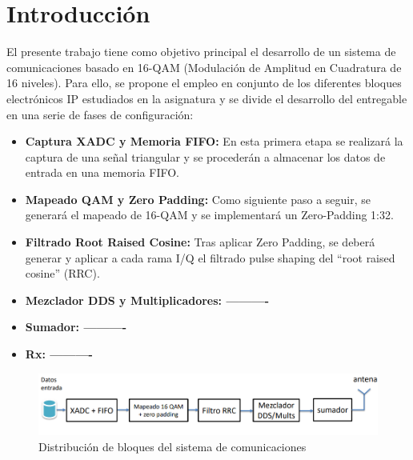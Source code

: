 \chapter{Introducción}
\label{section:intro}

El presente trabajo tiene como objetivo principal el desarrollo de un sistema de comunicaciones basado en 16-QAM (Modulación de Amplitud en Cuadratura de 16 niveles). Para ello, se propone el empleo en conjunto de los diferentes bloques electrónicos IP estudiados en la asignatura y se divide el desarrollo del entregable en una serie de fases de configuración:

\vspace{1mm}

\begin{itemize}
    \item \textbf{Captura XADC y Memoria FIFO:} En esta primera etapa se realizará la captura de una señal triangular y se procederán a almacenar los datos de entrada en una memoria FIFO.
    \item \textbf{Mapeado QAM y Zero Padding: } Como siguiente paso a seguir, se generará el mapeado de 16-QAM y se implementará un Zero-Padding 1:32. 
    \item \textbf{Filtrado Root Raised Cosine: } Tras aplicar Zero Padding, se deberá generar y aplicar a cada rama I/Q el filtrado pulse shaping del “root raised cosine” (RRC).
    \item \textbf{Mezclador DDS y Multiplicadores: ----------}
    \item \textbf{Sumador: ----------}
    \item \textbf{Rx: ----------}

    
\end{itemize}

\vspace{3mm}

    \begin{figure}[h]
    	\centering
    	\includegraphics[width=1\textwidth]{img/diseno/sistema.PNG}
    	\caption{Distribución de bloques del sistema de comunicaciones}
    	\label{fig:sistema}
    \end{figure}
    
\vspace{3mm}

